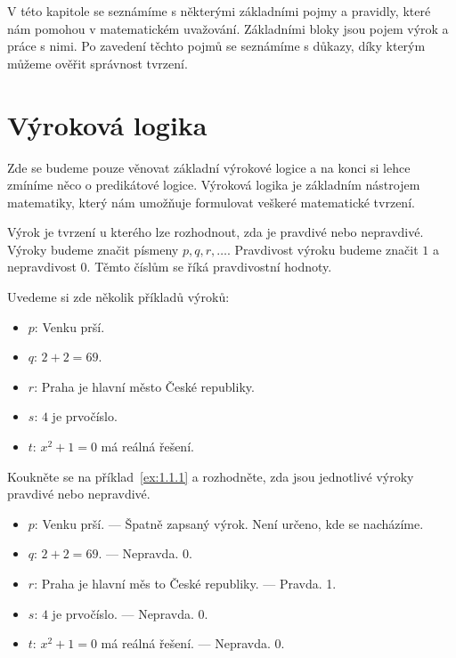 


V této kapitole se seznámíme s některými základními pojmy a pravidly, které nám pomohou v matematickém uvažování. Základními bloky jsou pojem výrok a práce s nimi. Po zavedení těchto pojmů se seznámíme s důkazy, díky kterým můžeme ověřit správnost tvrzení.

\section{Výroková logika}

Zde se budeme pouze věnovat základní výrokové logice a na konci si lehce zmíníme něco o predikátové logice. Výroková logika je základním nástrojem matematiky, který nám umožňuje formulovat veškeré matematické tvrzení.

\begin{definitionbox}
  Výrok je tvrzení u kterého lze rozhodnout, zda je pravdivé nebo nepravdivé. Výroky budeme značit písmeny $p, q, r, \ldots$. Pravdivost výroku budeme značit $1$ a nepravdivost $0$. Těmto číslům se říká pravdivostní hodnoty.
\end{definitionbox}
\begin{example}
  Uvedeme si zde několik příkladů výroků:
  \begin{itemize}
    \item $p$: Venku prší.
    \item $q$: $2 + 2 = 69$.
    \item $r$: Praha je hlavní město České republiky.
    \item $s$: $4$ je prvočíslo.
    \item $t$: $x^2 + 1 = 0$ má reálná řešení.
  \end{itemize}
\end{example}

\begin{problem}
  Koukněte se na příklad~\ref{ex:1.1.1} a rozhodněte, zda jsou jednotlivé výroky pravdivé nebo nepravdivé.
\end{problem}

\begin{solution}
  \begin{itemize}
    \item $p$: Venku prší. --- Špatně zapsaný výrok. Není určeno, kde se nacházíme.
    \item $q$: $2 + 2 = 69$. --- Nepravda. 0.
    \item $r$: Praha je hlavní měs to České republiky. --- Pravda. 1.
    \item $s$: $4$ je prvočíslo. --- Nepravda. 0.
    \item $t$: $x^2 + 1 = 0$ má reálná řešení. --- Nepravda. 0.
  \end{itemize}
\end{solution}

